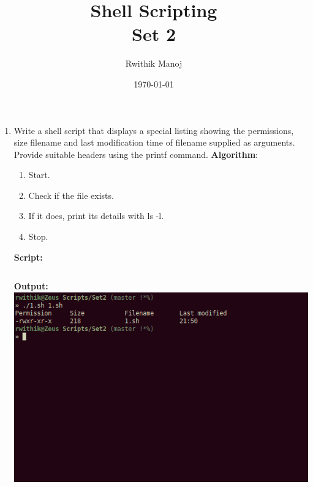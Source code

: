 \documentclass[10pt,a4paper,titlepage]{report}
\begin{document}
\begin{titlepage}
\author{Rwithik Manoj}
\title{Shell Scripting\\Set 2}
\date{\today}
\maketitle
\end{titlepage}

\begin{enumerate}
\item Write a shell script that displays a special listing showing the permissions, size filename and last modification time of filename supplied as arguments. Provide suitable headers using the printf command. \newline
\textbf{Algorithm}:\newline
\begin{enumerate}
	\item Start.
	\item Check if the file exists.
	\item If it does, print its details with {\color{red}ls -l}.
	\item Stop.
\end{enumerate}
\newline
\textbf{Script:}\newline
\inputminted{bash}{../Scripts/Set2/1.sh}
\newline
\textbf{Output:}\newline
\includegraphics[width=\linewidth]{../Images/Shell2/1.png}
\pagebreak


\end{enumerate}
\end{document}
